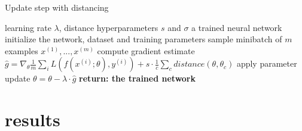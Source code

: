 \documentclass[
a4paper, 12pt, %
titlepage, 		 %
twoside,			 %
headsepline,	 %
BCOR5mm,			 %
idxtotoc, bibtotoc]{scrreprt}	%
\begin{document}
\begin{algorithm}\label{alg:Distance_update}
    \begin{algorithmic}[1]
        \caption{Update step with distancing}
        \REQUIRE learning rate $\lambda$, distance hyperparameters $s$ and $\sigma$
        \ENSURE a trained neural network
        \STATE initialize the network, dataset and training parameters
            \STATE sample minibatch of $m$ examples ${x^{(1)}, ... ,x^{(m)}}$
            \STATE compute gradient estimate $\hat{g}=\nabla_\theta \frac{1}{m} \sum_i L(f(x^{(i)};\theta),y^{(i)})+ s \cdot \frac{1}{c}\sum_c distance(\theta , \theta_c)$
            \STATE apply parameter update $\theta=\theta-\lambda\cdot\hat{g}$
        \ENDWHILE
        \STATE \textbf{return: the trained network}
    \end{algorithmic}
\end{algorithm}

\chapter{results}
\end{document}
